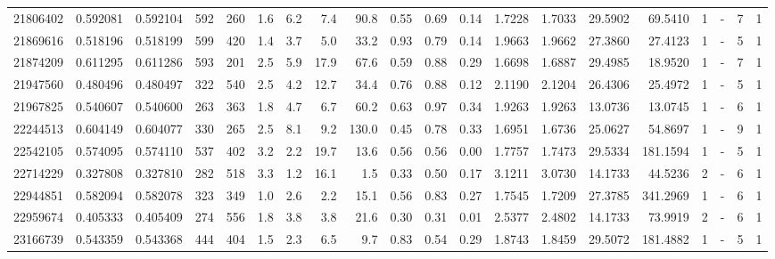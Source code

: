 \begin{tabular}{rrrrrrrrrrrrrrrrrlrl}
  21806402 & 0.592081 & 0.592104 &  592 &  260 &      1.6 &      6.2 &     7.4 &    90.8 &   0.55 &   0.69 &       0.14 &  1.7228 &  1.7033 &   29.5902 &   69.5410 &       1 &             - &        7 &         1 \\
  21869616 & 0.518196 & 0.518199 &  599 &  420 &      1.4 &      3.7 &     5.0 &    33.2 &   0.93 &   0.79 &       0.14 &  1.9663 &  1.9662 &   27.3860 &   27.4123 &       1 &             - &        5 &         1 \\
  21874209 & 0.611295 & 0.611286 &  593 &  201 &      2.5 &      5.9 &    17.9 &    67.6 &   0.59 &   0.88 &       0.29 &  1.6698 &  1.6887 &   29.4985 &   18.9520 &       1 &             - &        7 &         1 \\
  21947560 & 0.480496 & 0.480497 &  322 &  540 &      2.5 &      4.2 &    12.7 &    34.4 &   0.76 &   0.88 &       0.12 &  2.1190 &  2.1204 &   26.4306 &   25.4972 &       1 &             - &        5 &         1 \\
  21967825 & 0.540607 & 0.540600 &  263 &  363 &      1.8 &      4.7 &     6.7 &    60.2 &   0.63 &   0.97 &       0.34 &  1.9263 &  1.9263 &   13.0736 &   13.0745 &       1 &             - &        6 &         1 \\
  22244513 & 0.604149 & 0.604077 &  330 &  265 &      2.5 &      8.1 &     9.2 &   130.0 &   0.45 &   0.78 &       0.33 &  1.6951 &  1.6736 &   25.0627 &   54.8697 &       1 &             - &        9 &         1 \\
  22542105 & 0.574095 & 0.574110 &  537 &  402 &      3.2 &      2.2 &    19.7 &    13.6 &   0.56 &   0.56 &       0.00 &  1.7757 &  1.7473 &   29.5334 &  181.1594 &       1 &             - &        5 &         1 \\
  22714229 & 0.327808 & 0.327810 &  282 &  518 &      3.3 &      1.2 &    16.1 &     1.5 &   0.33 &   0.50 &       0.17 &  3.1211 &  3.0730 &   14.1733 &   44.5236 &       2 &             - &        6 &         1 \\
  22944851 & 0.582094 & 0.582078 &  323 &  349 &      1.0 &      2.6 &     2.2 &    15.1 &   0.56 &   0.83 &       0.27 &  1.7545 &  1.7209 &   27.3785 &  341.2969 &       1 &             - &        6 &         1 \\
  22959674 & 0.405333 & 0.405409 &  274 &  556 &      1.8 &      3.8 &     3.8 &    21.6 &   0.30 &   0.31 &       0.01 &  2.5377 &  2.4802 &   14.1733 &   73.9919 &       2 &             - &        6 &         1 \\
  23166739 & 0.543359 & 0.543368 &  444 &  404 &      1.5 &      2.3 &     6.5 &     9.7 &   0.83 &   0.54 &       0.29 &  1.8743 &  1.8459 &   29.5072 &  181.4882 &       1 &             - &        5 &         1 \\

\end{tabular}
